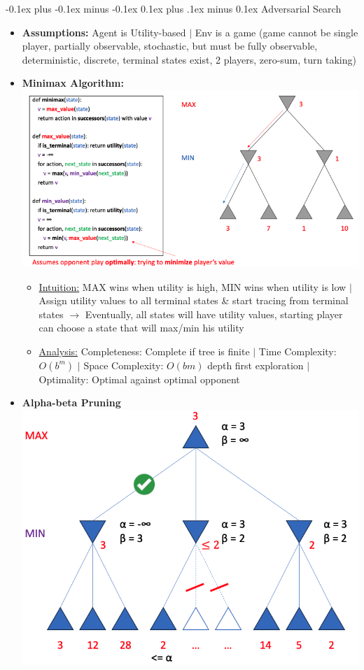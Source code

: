 \documentclass[landscape]{article}
\makeatletter
\renewcommand{\subsection}{\@startsection{subsection}{2}{0mm}%
  {-0.1ex plus -0.1ex minus -0.1ex}%
  {0.1ex plus .1ex minus 0.1ex}%
{\normalfont\scriptsize\bfseries}}
\makeatother
\begin{document}
\begin{multicols*}{5}
    \subsection{Adversarial Search}
    \begin{itemize}
      \item \textbf{Assumptions:} Agent is Utility-based $\vert$ Env is a game (game cannot be single player, partially observable, stochastic, but must be fully observable, deterministic, discrete, terminal states exist, 2 players, zero-sum, turn taking)
      \item \textbf{Minimax Algorithm:}
      \includegraphics[width=0.9\linewidth]{6_minimax.png}
      \begin{itemize}
        \item \underline{Intuition:} MAX wins when utility is high, MIN wins when utility is low $\vert$ Assign utility values to all terminal states \& start tracing from terminal states $\rightarrow$ Eventually, all states will have utility values, starting player can choose a state that will max/min his utility
        \item \underline{Analysis:} Completeness: Complete if tree is finite $\vert$ Time Complexity: $O(b^m)$ $\vert$ Space Complexity: $O(bm)$ depth first exploration $\vert$ Optimality: Optimal against optimal opponent
      \end{itemize}
      \item \textbf{Alpha-beta Pruning}
      \includegraphics[width=0.75\linewidth]{7_alphabeta.png}

\end{itemize}
\end{multicols*}
\end{document}
